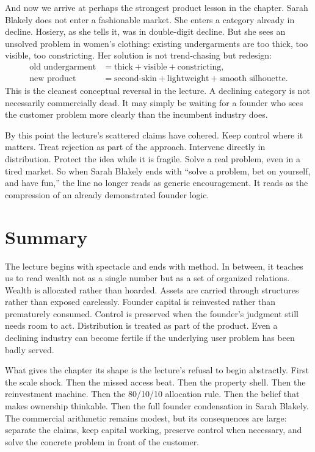 And now we arrive at perhaps the strongest product lesson in the chapter. Sarah Blakely does not enter a fashionable market. She enters a category already in decline. Hosiery, as she tells it, was in double-digit decline. But she sees an unsolved problem in women's clothing: existing undergarments are too thick, too visible, too constricting. Her solution is not trend-chasing but redesign:
\begin{align}
\text{old undergarment} &=
\text{thick} + \text{visible} + \text{constricting}, \\
\text{new product} &=
\text{second-skin} + \text{lightweight} + \text{smooth silhouette}.
\end{align}
This is the cleanest conceptual reversal in the lecture. A declining category is not necessarily commercially dead. It may simply be waiting for a founder who sees the customer problem more clearly than the incumbent industry does.

By this point the lecture's scattered claims have cohered. Keep control where it matters. Treat rejection as part of the approach. Intervene directly in distribution. Protect the idea while it is fragile. Solve a real problem, even in a tired market. So when Sarah Blakely ends with ``solve a problem, bet on yourself, and have fun,'' the line no longer reads as generic encouragement. It reads as the compression of an already demonstrated founder logic.

\section{Summary}

The lecture begins with spectacle and ends with method. In between, it teaches us to read wealth not as a single number but as a set of organized relations. Wealth is allocated rather than hoarded. Assets are carried through structures rather than exposed carelessly. Founder capital is reinvested rather than prematurely consumed. Control is preserved when the founder's judgment still needs room to act. Distribution is treated as part of the product. Even a declining industry can become fertile if the underlying user problem has been badly served.

What gives the chapter its shape is the lecture's refusal to begin abstractly. First the scale shock. Then the missed access beat. Then the property shell. Then the reinvestment machine. Then the 80/10/10 allocation rule. Then the belief that makes ownership thinkable. Then the full founder condensation in Sarah Blakely. The commercial arithmetic remains modest, but its consequences are large: separate the claims, keep capital working, preserve control when necessary, and solve the concrete problem in front of the customer.